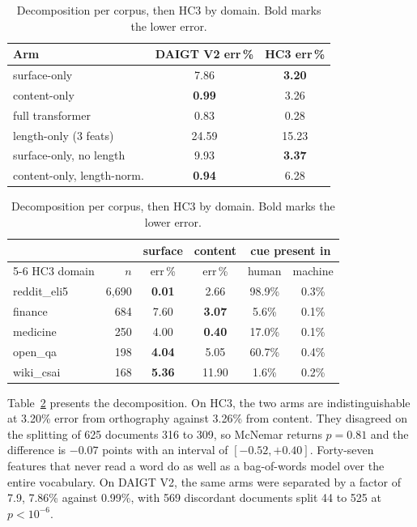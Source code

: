 \documentclass[conference,a4paper]{IEEEtran}
\newcommand{\tabref}[1]{\hyperref[#1]{\ref*{#1}}}
\begin{document}
\begin{table}[!t]
\centering
\caption{Decomposition per corpus, then HC3 by domain. Bold marks the lower error.}
\label{tab:decomp}
\scriptsize
\setlength{\tabcolsep}{3.5pt}
\begin{tabular}{@{}lcc@{}}
\toprule
Arm & DAIGT V2 err\,\% & HC3 err\,\% \\
\midrule
surface-only & 7.86 & \textbf{3.20} \\
content-only & \textbf{0.99} & 3.26 \\
full transformer & 0.83 & 0.28 \\
length-only (3 feats) & 24.59 & 15.23 \\
surface-only, no length & 9.93 & \textbf{3.37} \\
content-only, length-norm. & \textbf{0.94} & 6.28 \\
\bottomrule
\end{tabular}

\vspace{4pt}
\begin{tabular}{@{}lrcccc@{}}
\toprule
& & surface & content & \multicolumn{2}{c}{cue present in} \\
\cmidrule(lr){5-6}
HC3 domain & $n$ & err\,\% & err\,\% & human & machine \\
\midrule
reddit\_eli5 & 6,690 & \textbf{0.01} & 2.66 & 98.9\% & 0.3\% \\
finance & 684 & 7.60 & \textbf{3.07} & 5.6\% & 0.1\% \\
medicine & 250 & 4.00 & \textbf{0.40} & 17.0\% & 0.1\% \\
open\_qa & 198 & \textbf{4.04} & 5.05 & 60.7\% & 0.4\% \\
wiki\_csai & 168 & \textbf{5.36} & 11.90 & 1.6\% & 0.2\% \\
\bottomrule
\end{tabular}
\end{table}

Table~\tabref{tab:decomp} presents the decomposition. On HC3, the two arms are indistinguishable at 3.20\% error from orthography against 3.26\% from content. They disagreed on the splitting of 625 documents 316 to 309, so McNemar returns $p=0.81$ and the difference is $-0.07$ points with an interval of $[-0.52, +0.40]$. Forty-seven features that never read a word do as well as a bag-of-words model over the entire vocabulary. On DAIGT V2, the same arms were separated by a factor of 7.9, 7.86\% against 0.99\%, with 569 discordant documents split 44 to 525 at $p < 10^{-6}$.
\end{document}
